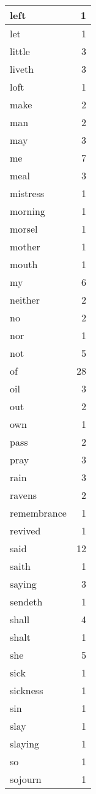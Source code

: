 \begin{center}
\begin{longtable}{l|r}
left & 1\\ \hline 
let & 1\\ \hline 
little & 3\\ \hline 
liveth & 3\\ \hline 
loft & 1\\ \hline 
make & 2\\ \hline 
man & 2\\ \hline 
may & 3\\ \hline 
me & 7\\ \hline 
meal & 3\\ \hline 
mistress & 1\\ \hline 
morning & 1\\ \hline 
morsel & 1\\ \hline 
mother & 1\\ \hline 
mouth & 1\\ \hline 
my & 6\\ \hline 
neither & 2\\ \hline 
no & 2\\ \hline 
nor & 1\\ \hline 
not & 5\\ \hline 
of & 28\\ \hline 
oil & 3\\ \hline 
out & 2\\ \hline 
own & 1\\ \hline 
pass & 2\\ \hline 
pray & 3\\ \hline 
rain & 3\\ \hline 
ravens & 2\\ \hline 
remembrance & 1\\ \hline 
revived & 1\\ \hline 
said & 12\\ \hline 
saith & 1\\ \hline 
saying & 3\\ \hline 
sendeth & 1\\ \hline 
shall & 4\\ \hline 
shalt & 1\\ \hline 
she & 5\\ \hline 
sick & 1\\ \hline 
sickness & 1\\ \hline 
sin & 1\\ \hline 
slay & 1\\ \hline 
slaying & 1\\ \hline 
so & 1\\ \hline 
sojourn & 1\\ \hline 

\end{longtable}
\end{center}
